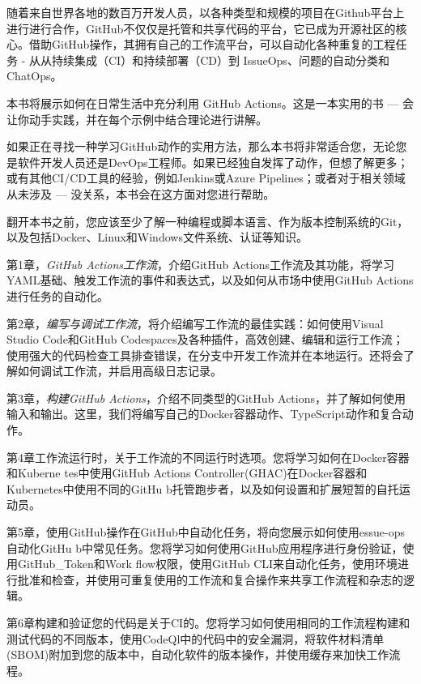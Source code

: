 随着来自世界各地的数百万开发人员，以各种类型和规模的项目在Github平台上进行进行合作，GitHub不仅仅是托管和共享代码的平台，它已成为开源社区的核心。借助GitHub操作，其拥有自己的工作流平台，可以自动化各种重复的工程任务 - 从从持续集成（CI）和持续部署（CD）到 IssueOps、问题的自动分类和 ChatOps。

本书将展示如何在日常生活中充分利用 GitHub Actions。这是一本实用的书 --- 会让你动手实践，并在每个示例中结合理论进行讲解。


如果正在寻找一种学习GitHub动作的实用方法，那么本书将非常适合您，无论您是软件开发人员还是DevOps工程师。如果已经独自发挥了动作，但想了解更多；或有其他CI/CD工具的经验，例如Jenkins或Azure Pipelines；或者对于相关领域从未涉及 --- 没关系，本书会在这方面对您进行帮助。

翻开本书之前，您应该至少了解一种编程或脚本语言、作为版本控制系统的Git，以及包括Docker、Linux和Windows文件系统、认证等知识。


第1章，\textit{GitHub Actions工作流}，介绍GitHub Actions工作流及其功能，将学习YAML基础、触发工作流的事件和表达式，以及如何从市场中使用GitHub Actions进行任务的自动化。

第2章，\textit{编写与调试工作流}，将介绍编写工作流的最佳实践：如何使用Visual Studio Code和GitHub Codespaces及各种插件，高效创建、编辑和运行工作流；使用强大的代码检查工具排查错误，在分支中开发工作流并在本地运行。还将会了解如何调试工作流，并启用高级日志记录。

第3章，\textit{构建GitHub Actions}，介绍不同类型的GitHub Actions，并了解如何使用输入和输出。这里，我们将编写自己的Docker容器动作、TypeScript动作和复合动作。

第4章工作流运行时，关于工作流的不同运行时选项。您将学习如何在Docker容器和Kuberne tes中使用GitHub Actions Controller(GHAC)在Docker容器和Kubernetes中使用不同的GitHu b托管跑步者，以及如何设置和扩展短暂的自托运动员。

第5章，使用GitHub操作在GitHub中自动化任务，将向您展示如何使用essue-ops自动化GitHu b中常见任务。您将学习如何使用GitHub应用程序进行身份验证，使用GitHub\_Token和Work flow权限，使用GitHub CLI来自动化任务，使用环境进行批准和检查，并使用可重复使用的工作流和复合操作来共享工作流程和杂志的逻辑。

第6章构建和验证您的代码是关于CI的。您将学习如何使用相同的工作流程构建和测试代码的不同版本，使用CodeQl中的代码中的安全漏洞，将软件材料清单(SBOM)附加到您的版本中，自动化软件的版本操作，并使用缓存来加快工作流程。

